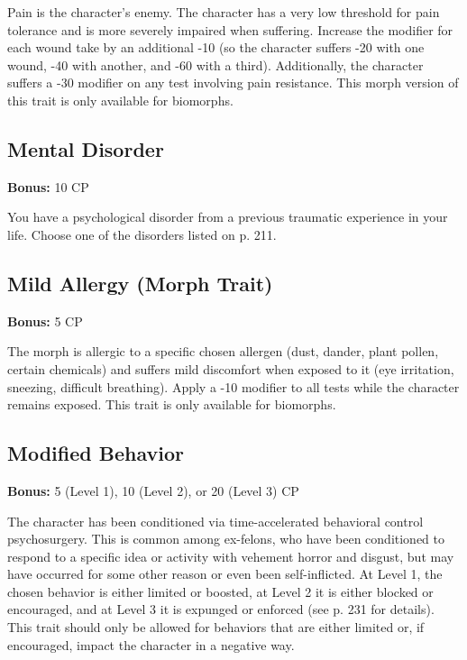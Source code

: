 Pain is the character’s enemy. The character has a very low threshold for pain tolerance and is more severely impaired when suffering. Increase the modifier for each wound take by an additional -10 (so the character suffers -20 with one wound, -40 with another, and -60 with a third). Additionally, the character suffers a -30 modifier on any test involving pain resistance. This morph version of this trait is only available for biomorphs. 

\subsection{Mental Disorder} \label{sec:traits-mental-disorder} 

\textbf{Bonus:} 10 CP 

You have a psychological disorder from a previous traumatic experience in your life. Choose one of the disorders listed on p. 211. 

\subsection{Mild Allergy (Morph Trait)} \label{sec:traits-mild-allergy} 

\textbf{Bonus:} 5 CP 

The morph is allergic to a specific chosen allergen (dust, dander, plant pollen, certain chemicals) and suffers mild discomfort when exposed to it (eye irritation, sneezing, difficult breathing). Apply a -10 modifier to all tests while the character remains exposed. This trait is only available for biomorphs. 

\subsection{Modified Behavior} \label{sec:traits-modified-behaviour} 

\textbf{Bonus:} 5 (Level 1), 10 (Level 2), or 20 (Level 3) CP 

The character has been conditioned via time-accelerated behavioral control psychosurgery. This is common among ex-felons, who have been conditioned to respond to a specific idea or activity with vehement horror and disgust, but may have occurred for some other reason or even been self-inflicted. At Level 1, the chosen behavior is either limited or boosted, at Level 2 it is either blocked or encouraged, and at Level 3 it is expunged or enforced (see p. 231 for details). This trait should only be allowed for behaviors that are either limited or, if encouraged, impact the character in a negative way. 

